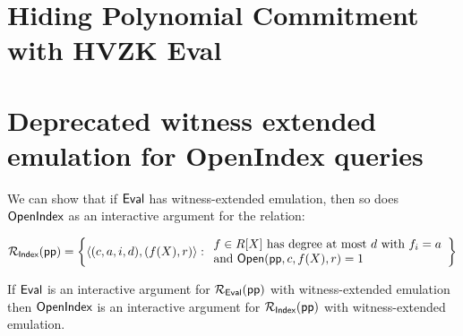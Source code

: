 \section{Hiding Polynomial Commitment with HVZK Eval} 






\section{Deprecated witness extended emulation for OpenIndex queries} 

We can show that if $\textsf{{Eval}}$ has witness-extended emulation, then so does $\textsf{{OpenIndex}}$ as an interactive argument for the relation: 

\[ 
\mathcal{R_\textsf{Index}}(\textsf{pp}) = \left\{
\langle (c, a, i, d), (f(X), r) \rangle
: 
\begin{array}{l} 
f \in R[X] \ \text{has degree at most} \ d \ \text{with} \ f_i = a \\ 
 \text{and} \ \textsf{{Open}}(\textsf{pp}, c, f(X), r) = 1 \\
\end{array}
\right\}
\] 


\begin{lemma} 
If $\textsf{{Eval}}$ is an interactive argument for $\mathcal{R_\textsf{Eval}}(\textsf{pp})$ with witness-extended emulation then $\textsf{{OpenIndex}}$ is an interactive argument for $\mathcal{R_\textsf{Index}}(\textsf{pp})$ with witness-extended emulation. 
\end{lemma}


